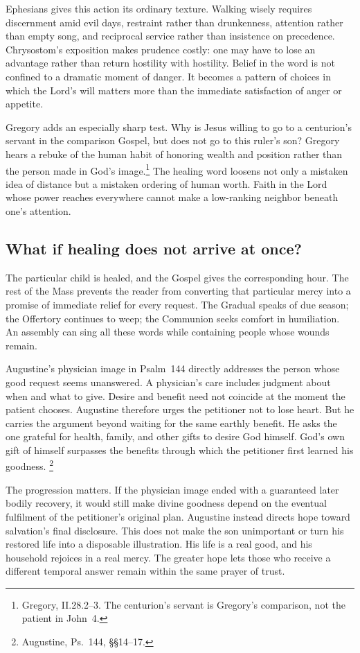 Ephesians gives this action its ordinary texture. Walking wisely requires
discernment amid evil days, restraint rather than drunkenness, attention
rather than empty song, and reciprocal service rather than insistence
on precedence. Chrysostom's exposition makes prudence costly: one may
have to lose an advantage rather than return hostility with hostility.
Belief in the word is not confined to a dramatic moment of danger. It
becomes a pattern of choices in which the Lord's will matters more than
the immediate satisfaction of anger or appetite.

Gregory adds an especially sharp test. Why is Jesus willing to go to a
centurion's servant in the comparison Gospel, but does not go to this
ruler's son? Gregory hears a rebuke of the human habit of honoring wealth
and position rather than the person made in God's image.\footnote{Gregory,
II.28.2--3. The centurion's servant is Gregory's comparison, not the
patient in John~4.}
The healing word loosens not only a mistaken idea of distance but a
mistaken ordering of human worth. Faith in the Lord whose power reaches
everywhere cannot make a low-ranking neighbor beneath one's attention.

\subsection{What if healing does not arrive at once?}
The particular child is healed, and the Gospel gives the corresponding
hour. The rest of the Mass prevents the reader from converting that
particular mercy into a promise of immediate relief for every request.
The Gradual speaks of due season; the Offertory continues to weep; the
Communion seeks comfort in humiliation. An assembly can sing all these
words while containing people whose wounds remain.

Augustine's physician image in Psalm~144 directly addresses the person
whose good request seems unanswered. A physician's care includes judgment
about when and what to give. Desire and benefit need not coincide at the
moment the patient chooses. Augustine therefore urges the petitioner
not to lose heart. But he carries the argument beyond waiting for the
same earthly benefit. He asks the one grateful for health, family, and
other gifts to desire God himself. God's own gift of himself surpasses
the benefits through which the petitioner first learned his goodness.
\footnote{Augustine, Ps.~144, \S\S14--17.}

The progression matters. If the physician image ended with a guaranteed
later bodily recovery, it would still make divine goodness depend on
the eventual fulfilment of the petitioner's original plan. Augustine
instead directs hope toward salvation's final disclosure. This does not
make the son unimportant or turn his restored life into a disposable
illustration. His life is a real good, and his household rejoices in a
real mercy. The greater hope lets those who receive a different temporal
answer remain within the same prayer of trust.

